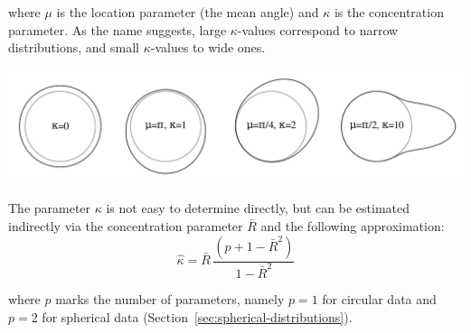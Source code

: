 \noindent where $\mu$ is the location parameter (the mean angle) and
$\kappa$ is the concentration parameter. As the name suggests, large
$\kappa$-values correspond to narrow distributions, and small
$\kappa$-values to wide ones.

\noindent\includegraphics[width=\textwidth]{../figures/vonMises.pdf}
\begingroup {}
\label{fig:vonMises}\endgroup

The parameter $\kappa$ is not easy to determine directly, but can be
estimated indirectly via the concentration parameter $\bar{R}$ and the
following approximation:
\begin{equation}
  \hat{\kappa} = \bar{R}\,\frac{(p+1-\bar{R}^2)}{1-\bar{R}^2}
  \label{eq:kappa}
\end{equation}

\noindent where $p$ marks the number of parameters, namely $p=1$ for
circular data and $p=2$ for spherical data
(Section~\ref{sec:spherical-distributions}).

